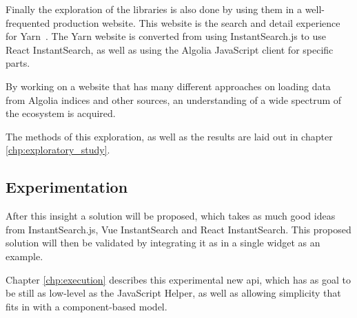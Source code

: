 Finally the exploration of the libraries is also done by using them in a well-frequented production website. This website is the search and detail experience for Yarn\cite{yarn-site}~. The Yarn website is converted from using InstantSearch.js to use React InstantSearch, as well as using the Algolia JavaScript client for specific parts.

By working on a website that has many different approaches on loading data from Algolia indices and other sources, an understanding of a wide spectrum of the ecosystem is acquired.

The methods of this exploration, as well as the results are laid out in chapter \ref{chp:exploratory_study}.

\subsection{Experimentation}

After this insight a solution will be proposed, which takes as much good ideas from InstantSearch.js, Vue InstantSearch and React InstantSearch. This proposed solution will then be validated by integrating it as in a single widget as an example.

Chapter \ref{chp:execution} describes this experimental new \acrshort{api}, which has as goal to be still as low-level as the JavaScript Helper, as well as allowing simplicity that fits in with a component-based model.
